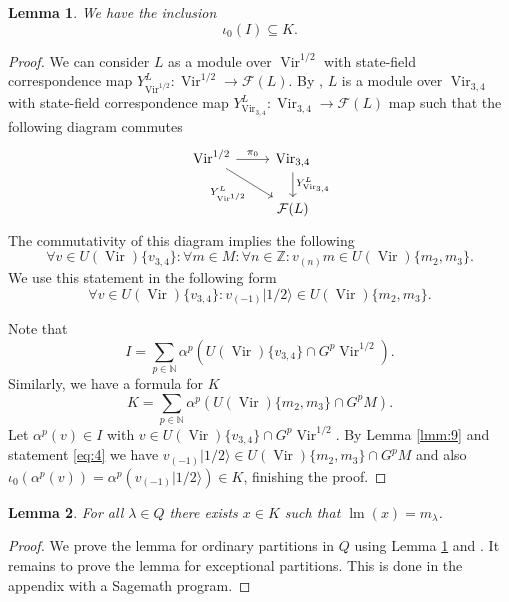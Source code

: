\documentclass[12pt,a4paper]{article}
\newtheorem{lemma}{Lemma}
\DeclareMathOperator{\Vir}{Vir}
\DeclareMathOperator{\lm}{lm}
\newcommand{\vachalf}{|1/2\rangle}
\begin{document}
\begin{lemma}
  \label{lmm:10}
  We have the inclusion
  \begin{equation*}
    \iota_0(I)\subseteq K.
  \end{equation*}
\end{lemma}
\begin{proof}
  We can consider $L$ as a module over $\Vir^{1/2}$ with state-field correspondence map $Y^L_{\Vir^{1/2}}:\Vir^{1/2}\to \mathcal{F}(L)$.
  By \cite[Theorem 4.2.]{wang_rationality_1993}, $L$ is a module over $\Vir_{3,4}$ with state-field correspondence map $Y^L_{\Vir_{3,4}}:\Vir_{3,4}\to \mathcal{F}(L)$ map such that the following diagram commutes
  \begin{equation*}
    \begin{tikzcd}
      \Vir^{1/2} \arrow[r, "\pi_0"] \arrow[rd, "{Y^{L}_{\Vir^{1/2}}}"'] & {\Vir_{3,4}} \arrow[d, "{Y^{L}_{\Vir_{3,4}}}"] \\
      & {\mathcal{F}(L)}
    \end{tikzcd}
  \end{equation*}
  The commutativity of this diagram implies the following
  \begin{equation*}
    \forall v\in U(\Vir)\{v_{3,4}\}:\forall m\in M:\forall n\in \mathbb{Z}:v_{(n)}m\in U(\Vir)\{m_2,m_3\}.
  \end{equation*}
  We use this statement in the following form
  \begin{equation}
    \label{eq:4}
    \forall v\in U(\Vir)\{v_{3,4}\}:v_{(-1)}\vachalf\in U(\Vir)\{m_2,m_3\}.
  \end{equation}
  
  Note that
  \begin{equation*}
    I=\sum_{p\in \mathbb{N}}\alpha^p(U(\Vir)\{v_{3,4}\}\cap G^p\Vir^{1/2}).
  \end{equation*}
  Similarly, we have a formula for $K$
  \begin{equation*}
    K=\sum_{p\in \mathbb{N}}\alpha^p(U(\Vir)\{m_2,m_3\}\cap G^pM).
  \end{equation*}
  Let $\alpha^p(v)\in I$ with $v\in U(\Vir)\{v_{3,4}\}\cap G^p\Vir^{1/2}$.
  By Lemma \ref{lmm:9} and statement \eqref{eq:4} we have $v_{(-1)}\vachalf\in U(\Vir)\{m_2,m_3\}\cap G^pM$ and also $\iota_0(\alpha^p(v))=\alpha^p(v_{(-1)}\vachalf)\in K$, finishing the proof.
  
\end{proof}

\begin{lemma}
  \label{lmm:11}
  For all $\lambda\in Q$ there exists $x\in K$ such that $\lm(x)=m_\lambda$.
\end{lemma}
\begin{proof}
  We prove the lemma for ordinary partitions in $Q$ using Lemma \ref{lmm:10} and \cite[5.1 Proposition]{andrews_singular_2022}.
  It remains to prove the lemma for exceptional partitions.
  This is done in the appendix with a Sagemath program. 
\end{proof}
\end{document}
